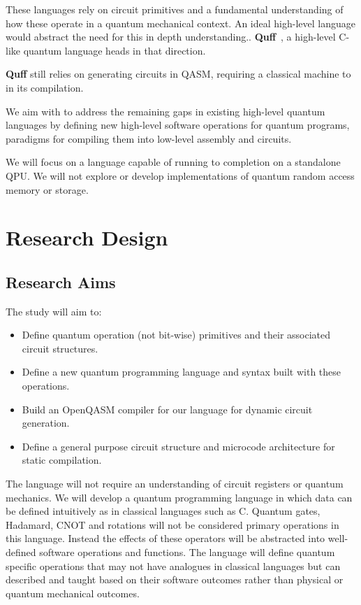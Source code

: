 \documentclass[journal,onecolumn, compsoc]{IEEEtran}
\begin{document}
These languages rely on circuit primitives and a fundamental understanding of how these operate in a quantum mechanical context.
An ideal high-level language would abstract the need for this in depth understanding..
\textbf{Quff}~\cite{quff2024}, a high-level C-like quantum language heads in that direction. 

\textbf{Quff} still relies on generating circuits in QASM, requiring a classical machine to in its compilation.

We aim with to address the remaining gaps in existing high-level quantum languages by defining new high-level software operations for quantum programs, paradigms for compiling them into low-level assembly and circuits.

We will focus on a language capable of running to completion on a standalone QPU. 
We will not explore or develop implementations of quantum random access memory or storage.

\section{Research Design}
\subsection{Research Aims}
The study will aim to:
\begin{itemize}
    \item Define quantum operation (not bit-wise) primitives and their associated circuit structures.
    \item Define a new quantum programming language and syntax built with these operations.
    \item Build an OpenQASM compiler for our language for dynamic circuit generation.
    \item Define a general purpose circuit structure and microcode architecture for static compilation.
\end{itemize}

The language will not require an understanding of circuit registers or quantum mechanics.
We will develop a quantum programming language in which data can be defined intuitively as in classical languages such as C.
Quantum gates, Hadamard, CNOT and rotations will not be considered primary operations in this language.
Instead the effects of these operators will be abstracted into well-defined software operations and functions.
The language will define quantum specific operations that may not have analogues in classical languages but can described and taught based on their software outcomes rather than physical or quantum mechanical outcomes.
\end{document}

